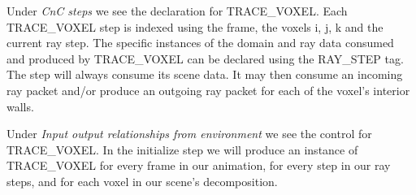 Under \emph{CnC steps} we see the declaration for TRACE\_VOXEL. Each
TRACE\_VOXEL step is indexed using the frame, the voxels i, j, k and
the current ray step. The specific instances of the domain and ray
data consumed and produced by TRACE\_VOXEL can be declared using the
RAY\_STEP tag. The step will always consume its scene data. It may
then consume an incoming ray packet and/or produce an outgoing ray
packet for each of the voxel's interior walls.

Under \emph{Input output relationships from environment} we see the
control for TRACE\_VOXEL. In the initialize step we will produce an
instance of TRACE\_VOXEL for every frame in our animation, for every
step in our ray steps, and for each voxel in our scene's
decomposition.
